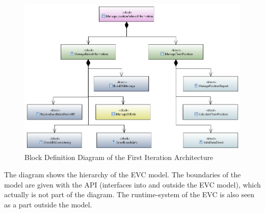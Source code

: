 \documentclass{template/openetcs_article}
\begin{document}
\begin{figure}[h]
\centering
\includegraphics[scale=0.6]{../images/FunctionalArchitectureBDD.PNG}
\caption{Block Definition Diagram of the First Iteration Architecture}
\end{figure}

The diagram shows the hierarchy of the EVC model. The boundaries of the model are given with the API (interfaces into and outside the EVC model), which actually is not part of the diagram. The runtime-system of the EVC is also seen as a part outside the model.
\end{document}
